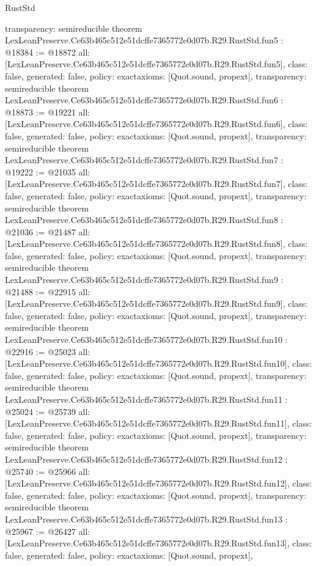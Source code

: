 \begin{lexlean}{RustStd}
\begin{coremodule}
{  transparency: semireducible
}
theorem LexLeanPreserve.Ce63b465c512e51dcffe7365772e0d07b.R29.RustStd.fun5 : @18384 := @18872 {
  all: [LexLeanPreserve.Ce63b465c512e51dcffe7365772e0d07b.R29.RustStd.fun5],
  class: false,
  generated: false,
  policy: exact{axioms: [Quot.sound, propext]},
  transparency: semireducible
}
theorem LexLeanPreserve.Ce63b465c512e51dcffe7365772e0d07b.R29.RustStd.fun6 : @18873 := @19221 {
  all: [LexLeanPreserve.Ce63b465c512e51dcffe7365772e0d07b.R29.RustStd.fun6],
  class: false,
  generated: false,
  policy: exact{axioms: [Quot.sound, propext]},
  transparency: semireducible
}
theorem LexLeanPreserve.Ce63b465c512e51dcffe7365772e0d07b.R29.RustStd.fun7 : @19222 := @21035 {
  all: [LexLeanPreserve.Ce63b465c512e51dcffe7365772e0d07b.R29.RustStd.fun7],
  class: false,
  generated: false,
  policy: exact{axioms: [Quot.sound, propext]},
  transparency: semireducible
}
theorem LexLeanPreserve.Ce63b465c512e51dcffe7365772e0d07b.R29.RustStd.fun8 : @21036 := @21487 {
  all: [LexLeanPreserve.Ce63b465c512e51dcffe7365772e0d07b.R29.RustStd.fun8],
  class: false,
  generated: false,
  policy: exact{axioms: [Quot.sound, propext]},
  transparency: semireducible
}
theorem LexLeanPreserve.Ce63b465c512e51dcffe7365772e0d07b.R29.RustStd.fun9 : @21488 := @22915 {
  all: [LexLeanPreserve.Ce63b465c512e51dcffe7365772e0d07b.R29.RustStd.fun9],
  class: false,
  generated: false,
  policy: exact{axioms: [Quot.sound, propext]},
  transparency: semireducible
}
theorem LexLeanPreserve.Ce63b465c512e51dcffe7365772e0d07b.R29.RustStd.fun10 : @22916 := @25023 {
  all: [LexLeanPreserve.Ce63b465c512e51dcffe7365772e0d07b.R29.RustStd.fun10],
  class: false,
  generated: false,
  policy: exact{axioms: [Quot.sound, propext]},
  transparency: semireducible
}
theorem LexLeanPreserve.Ce63b465c512e51dcffe7365772e0d07b.R29.RustStd.fun11 : @25024 := @25739 {
  all: [LexLeanPreserve.Ce63b465c512e51dcffe7365772e0d07b.R29.RustStd.fun11],
  class: false,
  generated: false,
  policy: exact{axioms: [Quot.sound, propext]},
  transparency: semireducible
}
theorem LexLeanPreserve.Ce63b465c512e51dcffe7365772e0d07b.R29.RustStd.fun12 : @25740 := @25966 {
  all: [LexLeanPreserve.Ce63b465c512e51dcffe7365772e0d07b.R29.RustStd.fun12],
  class: false,
  generated: false,
  policy: exact{axioms: [Quot.sound, propext]},
  transparency: semireducible
}
theorem LexLeanPreserve.Ce63b465c512e51dcffe7365772e0d07b.R29.RustStd.fun13 : @25967 := @26427 {
  all: [LexLeanPreserve.Ce63b465c512e51dcffe7365772e0d07b.R29.RustStd.fun13],
  class: false,
  generated: false,
  policy: exact{axioms: [Quot.sound, propext]},
}
\end{coremodule}
\end{lexlean}
